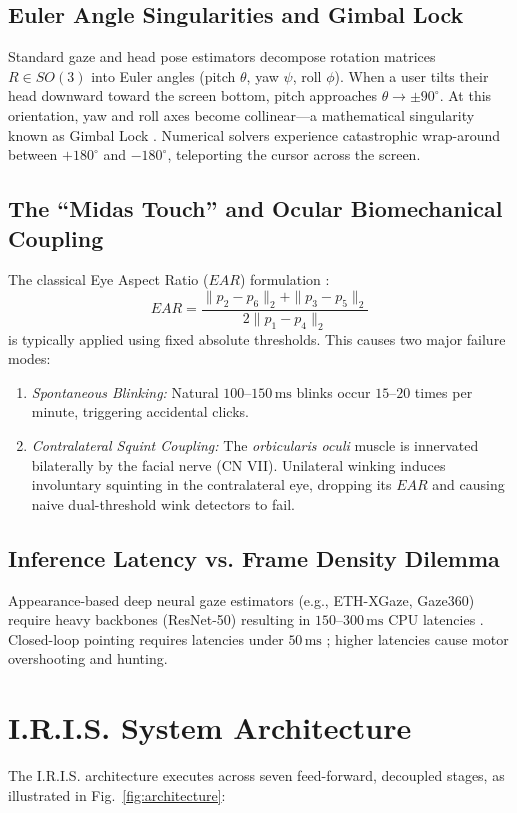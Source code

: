 \documentclass[conference]{IEEEtran}
\begin{document}
\subsection{Euler Angle Singularities and Gimbal Lock}
Standard gaze and head pose estimators decompose rotation matrices $R \in SO(3)$ into Euler angles (pitch $\theta$, yaw $\psi$, roll $\phi$). When a user tilts their head downward toward the screen bottom, pitch approaches $\theta \to \pm 90^\circ$. At this orientation, yaw and roll axes become collinear—a mathematical singularity known as Gimbal Lock \cite{lepetit2009}. Numerical solvers experience catastrophic wrap-around between $+180^\circ$ and $-180^\circ$, teleporting the cursor across the screen.

\subsection{The ``Midas Touch'' and Ocular Biomechanical Coupling}
The classical Eye Aspect Ratio ($EAR$) formulation \cite{soukupova2016}:
\begin{equation}
EAR = \frac{\|p_2 - p_6\|_2 + \|p_3 - p_5\|_2}{2 \|p_1 - p_4\|_2}
\end{equation}
is typically applied using fixed absolute thresholds. This causes two major failure modes:
\begin{enumerate}
    \item \textit{Spontaneous Blinking:} Natural $100$--$150\,\text{ms}$ blinks occur $15$--$20$ times per minute, triggering accidental clicks.
    \item \textit{Contralateral Squint Coupling:} The \textit{orbicularis oculi} muscle is innervated bilaterally by the facial nerve (CN VII). Unilateral winking induces involuntary squinting in the contralateral eye, dropping its $EAR$ and causing naive dual-threshold wink detectors to fail.
\end{enumerate}

\subsection{Inference Latency vs. Frame Density Dilemma}
Appearance-based deep neural gaze estimators (e.g., ETH-XGaze, Gaze360) require heavy backbones (ResNet-50) resulting in $150$--$300\,\text{ms}$ CPU latencies \cite{zhang2017}. Closed-loop pointing requires latencies under $50\,\text{ms}$ \cite{mackenzie1992}; higher latencies cause motor overshooting and hunting.

\section{I.R.I.S. System Architecture}
The I.R.I.S. architecture executes across seven feed-forward, decoupled stages, as illustrated in Fig.~\ref{fig:architecture}:
\end{document}
